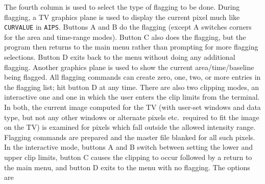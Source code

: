     The fourth column is used to select the type of flagging to be
done.  During flagging, a TV graphics plane is used to display the
current pixel much like {\tt CURVALUE} in {\tt AIPS}\@.  Buttons
A and B  do the flagging (except A switches corners for the area and
time-range modes).  Button C also does the flagging, but the program
then returns to the main menu rather than prompting for more flagging
selections.  Button D exits back to the menu without doing any
additional flagging.  Another graphics plane is used to show the
current area/time/baseline being flagged.  All flagging commands can
create zero, one, two, or more entries in the flagging list; hit
button D at any time.  There are also two clipping modes, an
interactive one and one in which the user enters the clip limits from
the terminal.  In both, the current image computed for the TV (with
user-set windows and data type, but not any other windows or alternate
pixels etc.~required to fit the image on the TV) is examined for
pixels which fall outside the allowed intensity range.  Flagging
commands are prepared and the master file blanked for all such pixels.
In the interactive mode, buttons A and B switch between setting the
lower and upper clip limits, button C causes the clipping to occur
followed by a return to the main menu, and button D exits to the menu
with no flagging.  The options are
